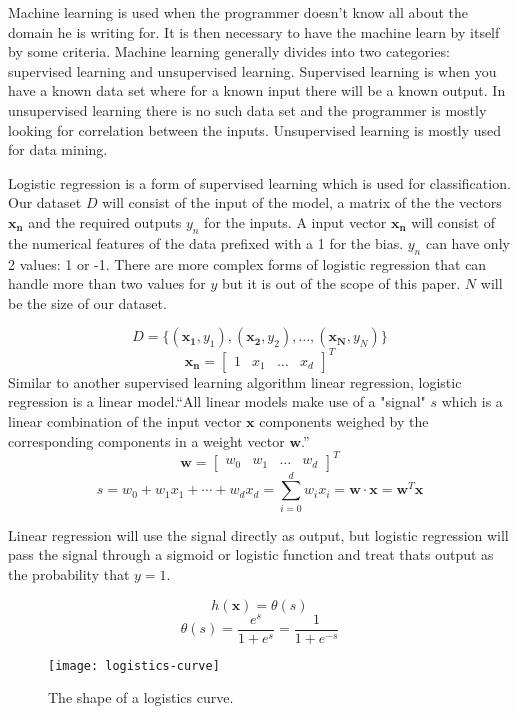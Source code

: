 Machine learning is used when the programmer doesn't know all about the domain he is writing for. It is then necessary to have the machine learn by itself by some criteria. Machine learning generally divides into two categories: supervised learning and unsupervised learning. Supervised learning is when you have a known data set where for a known input there will be a known output. In unsupervised learning there is no such data set and the programmer is mostly looking for correlation between the inputs. Unsupervised learning is mostly used for data mining.

Logistic regression is a form of supervised learning which is used for
classification. Our dataset $D$ will consist of the input of the model, a matrix
of the the vectors $\mathbf{x_n}$ and the required outputs $y_n$ for the inputs.
A input vector $\mathbf{x_n}$ will consist of the numerical features of the data
prefixed with a 1 for the bias. $y_n$ can have only 2 values: 1 or -1. There are
more complex forms of logistic regression that can handle more than two values
for $y$ but it is out of the scope of this paper. $N$ will be the size of our
dataset.

\[ D = \{ (\mathbf{x_1}, y_1), (\mathbf{x_2}, y_2), \ldots, (\mathbf{x_N}, y_N)\} \]
\[ \mathbf{x_n} = [ \begin{array}{cccc} 1 & x_1 & \ldots & x_d\end{array} ]^T \]
Similar to another supervised learning algorithm linear regression, logistic
regression is a linear model.``All linear models make use of a "signal" $s$
which is a linear combination of the input vector $\mathbf{x}$ components
weighed by the corresponding components in a weight vector
$\mathbf{w}$.''\cite{website:website:logistic-regression}
\[\mathbf{w} = \left[\begin{array}{cccc} w_0 & w_1 & \ldots & w_d \end{array}
\right]^T \] \[s = w_0 + w_1 x_1 + \cdots + w_d x_d = \sum_{i=0}^d w_i x_i =
\mathbf{w} \cdot \mathbf{x} = \mathbf{w}^T \mathbf{x}\]

Linear regression will use the signal directly as output, but logistic
regression will pass the signal through a sigmoid or logistic function and treat
thats output as the probability that $y=1$.

\[h(\mathbf{x}) = \theta(s)\]
\[\theta(s) = \frac{e^s}{1+e^s} = \frac{1}{1 + e^{-s}}\]

\begin{figure}[htp]
\begin{center}
  \texttt{[image: logistics-curve]}
  \caption[Logistics curve]{The shape of a logistics curve.}
  \label{logistics-curve}
\end{center}
\end{figure}

